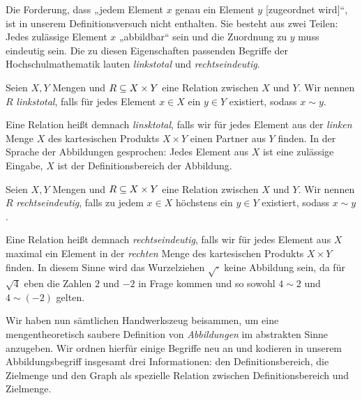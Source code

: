 Die Forderung, dass „jedem Element $x$ genau ein Element $y$ [zugeordnet wird]“,
ist in unserem Definitionsversuch nicht enthalten. Sie besteht aus zwei Teilen:
Jedes zulässige Element $x$ „abbildbar“ sein und die Zuordnung zu $y$ muss
eindeutig sein. Die zu diesen Eigenschaften passenden Begriffe der
Hochschulmathematik lauten \emph{linkstotal} und \emph{rechtseindeutig}.


\begin{defin}
  Seien $X,Y$ Mengen und $R \subseteq X\times Y$ eine Relation zwischen $X$ und $Y$.
  Wir nennen $R$ \emph{linkstotal}, falls für jedes Element $x\in X$ ein $y\in
  Y$ existiert, sodass $x \sim y$.
\end{defin}


Eine Relation heißt demnach \emph{linsktotal}, falls wir für jedes Element aus der
\emph{linken} Menge $X$ des kartesischen Produkts $X\times Y$ einen Partner aus
$Y$ finden. In der Sprache der Abbildungen gesprochen: Jedes Element aus $X$ ist
eine zulässige Eingabe, $X$ ist der Definitionsbereich der Abbildung.


\begin{defin}
  Seien $X,Y$ Mengen und $R \subseteq X\times Y$ eine Relation zwischen $X$ und $Y$.
  Wir nennen $R$ \emph{rechtseindeutig}, falls zu jedem $x\in X$ höchstens ein
  $y\in Y$ existiert, sodass $x\sim y$.
\end{defin}


Eine Relation heißt demnach \emph{rechtseindeutig}, falls wir für jedes Element
aus $X$ maximal ein Element in der \emph{rechten} Menge des kartesischen
Produkts $X\times Y$ finden. In diesem Sinne wird das Wurzelziehen
$\sqrt{\cdot}$ keine Abbildung sein, da für $\sqrt{4}$ eben die Zahlen $2$ und
$-2$ in Frage kommen und so sowohl $4 \sim 2$ und $4 \sim (-2)$ gelten.


Wir haben nun sämtlichen Handwerkszeug beisammen, um eine mengentheoretisch
saubere Definition von \emph{Abbildungen} im abstrakten Sinne anzugeben. Wir
ordnen hierfür einige Begriffe neu an und kodieren in unserem Abbildungsbegriff
insgesamt drei Informationen: den Definitionsbereich, die Zielmenge und den
Graph als spezielle Relation zwischen Definitionsbereich und Zielmenge.

